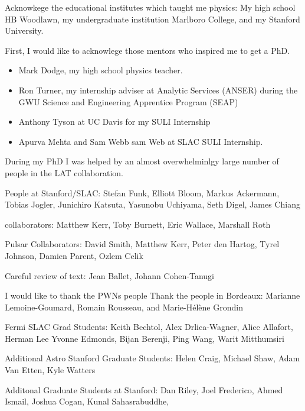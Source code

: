 

Acknowkege the educational institutes which taught me physics: My high school HB Woodlawn,
my undergraduate institution Marlboro College, and my Stanford University.

First, I would like to acknowlege those mentors who inspired me to get a PhD.
\begin{itemize}
  \item Mark Dodge, my high school physics teacher.
  \item Ron Turner, my internship adviser at Analytic Services (ANSER) during the 
  GWU Science and Engineering Apprentice Program (SEAP)
  \item Anthony Tyson at UC Davis for my SULI Internship
  \item Apurva Mehta and Sam Webb sam Web at SLAC SULI Internship.
\end{itemize}


During my PhD I was helped by an almost overwhelminlgy large 
number of people in the \ac{LAT} collaboration.

People at Stanford/SLAC: Stefan Funk, Elliott Bloom, 
Markus Ackermann, Tobias Jogler, Junichiro Katsuta, Yasunobu Uchiyama, Seth Digel, 
James Chiang

\pointlike collaborators: Matthew Kerr, Toby Burnett, Eric Wallace, Marshall Roth

Pulsar Collaborators: David Smith, Matthew Kerr, Peter den Hartog, Tyrel Johnson, Damien Parent, Ozlem Celik

Careful review of text: Jean Ballet, Johann Cohen-Tanugi

I would like to thank the \acp{PWN} people
Thank the people in Bordeaux: Marianne Lemoine-Goumard, Romain Rousseau, and Marie-H\'el\`ene Grondin


Fermi SLAC Grad Students: Keith Bechtol, Alex Drlica-Wagner, Alice Allafort, Herman Lee
Yvonne Edmonds, Bijan Berenji, Ping Wang, Warit Mitthumsiri


Additional Astro Stanford Graduate Students: Helen Craig, Michael Shaw, Adam Van Etten, Kyle Watters

Additonal Graduate Students at Stanford: Dan Riley, Joel Frederico, Ahmed Ismail, Joshua Cogan, Kunal Sahasrabuddhe,
